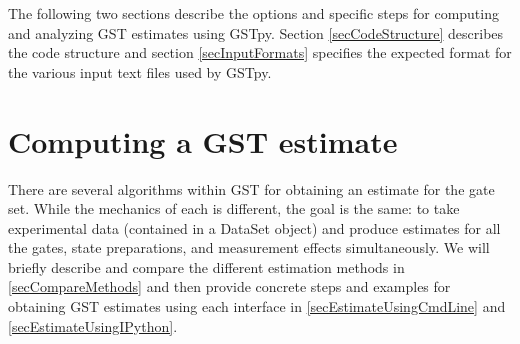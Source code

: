\documentclass{article}[11pt]
\begin{document}
The following two sections describe the options and specific steps for computing and analyzing GST estimates using GSTpy.  Section \ref{secCodeStructure} describes the code structure and section \ref{secInputFormats} specifies the expected format for the various input text files used by GSTpy.

\section{Computing a GST estimate\label{secComputeEstimate}}
There are several algorithms within GST for obtaining an estimate for the gate set.  While the mechanics of each is different, the goal is the same: to take experimental data (contained in a DataSet object) and produce estimates for all the gates, state preparations, and measurement effects simultaneously.  We will briefly describe and compare the different estimation methods in \ref{secCompareMethods} and then provide concrete steps and examples for obtaining GST estimates using each interface in \ref{secEstimateUsingCmdLine} and \ref{secEstimateUsingIPython}. 
\end{document}
